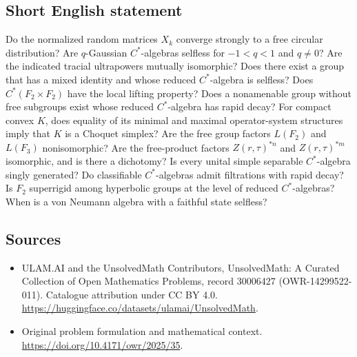 \documentclass[11pt]{article}
\begin{document}
\subsection{Short English statement}
Do the normalized random matrices $X_k$ converge strongly to a free circular distribution? Are $q$-Gaussian $C^*$-algebras selfless for $-1<q<1$ and $q\neq0$? Are the indicated tracial ultrapowers mutually isomorphic? Does there exist a group that has a mixed identity and whose reduced $C^*$-algebra is selfless? Does $C^*(F_2\times F_2)$ have the local lifting property? Does a nonamenable group without free subgroups exist whose reduced $C^*$-algebra has rapid decay? For compact convex $K$, does equality of its minimal and maximal operator-system structures imply that $K$ is a Choquet simplex? Are the free group factors $L(F_2)$ and $L(F_3)$ nonisomorphic? Are the free-product factors $Z(r,\tau)^{*n}$ and $Z(r,\tau)^{*m}$ isomorphic, and is there a dichotomy? Is every unital simple separable $C^*$-algebra singly generated? Do classifiable $C^*$-algebras admit filtrations with rapid decay? Is $F_2$ superrigid among hyperbolic groups at the level of reduced $C^*$-algebras? When is a von Neumann algebra with a faithful state selfless?
\subsection{Sources}
\begin{itemize}
\item[\hypertarget{source:30006427:1}{S1}] ULAM.AI and the UnsolvedMath Contributors, UnsolvedMath: A Curated Collection of Open Mathematics Problems, record 30006427 (OWR-14299522-011). Catalogue attribution under CC BY 4.0.
\url{https://huggingface.co/datasets/ulamai/UnsolvedMath}.
\item[\hypertarget{source:30006427:2}{S2}] Original problem formulation and mathematical context.
\url{https://doi.org/10.4171/owr/2025/35}.
\end{itemize}
\label{end:30006427}
\end{document}
